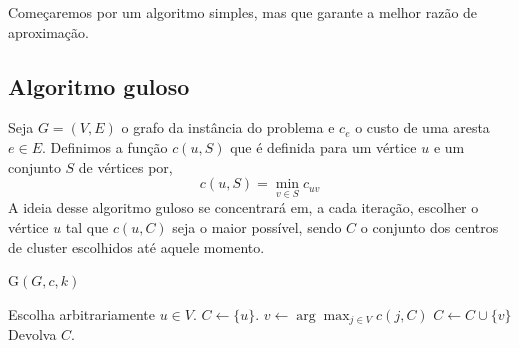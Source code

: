 \documentclass[12pt]{article}
\begin{document}
    Começaremos por um algoritmo simples, mas que garante a melhor razão de aproximação.
    
\newpage
\subsection{Algoritmo guloso}
    Seja $G = (V,E)$ o grafo da instância do problema e $c_e$ o custo de uma aresta $e \in E$.
    Definimos a função $c(u,S)$ que é definida para um vértice $u$ e um conjunto $S$ de vértices  por,
    \[ c(u,S) = \min_{v\in S} c_{uv}
        \]
    A ideia desse algoritmo guloso se concentrará em, a cada iteração, escolher o vértice $u$ tal que $c(u,C)$ seja o maior possível, sendo $C$ o conjunto dos centros de cluster escolhidos até aquele momento.

    \begin{algorithm}
		\caption{G$(G,c,k)$}
        \label{k-center:guloso}
        \begin{algorithmic}[1]
			\State Escolha arbitrariamente $u \in V$.
            \State $C \gets \{u\}$.
            \State $v \gets \arg\max_{j \in V} c(j,C)$
            \State $C \gets C \cup \{v\}$
            \EndWhile 
			\State Devolva $C$.
		\end{algorithmic}
	\end{algorithm}
    
\end{document}
